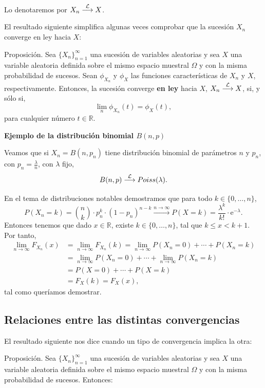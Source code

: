 \documentclass[]{book}
\begin{document}
Lo denotaremos por \(X_n\stackrel{{\cal L}}{\longrightarrow}X\).

El resultado siguiente simplifica algunas veces comprobar que la sucesión \(X_n\) converge en ley hacia \(X\):

 Proposición.
Sea \(\{X_n\}_{n=1}^\infty\) una sucesión de variables aleatorias y sea \(X\) una variable aleatoria definida sobre el mismo espacio muestral \(\Omega\) y con la misma probabilidad de sucesos. Sean \(\phi_{X_n}\) y \(\phi_X\) las funciones características de \(X_n\) y \(X\), respectivamente. Entonces, la sucesión converge \textbf{en ley} hacia \(X\), \(X_n\stackrel{{\cal L}}{\longrightarrow}X\), si, y sólo si,
\[
\lim_{n} \phi_{X_n}(t) = \phi_X(t),
\]
para cualquier número \(t\in\mathbb{R}\).

\textbf{Ejemplo de la distribución binomial \(B(n,p)\)}

Veamos que si \(X_n=B(n,p_n)\) tiene distribución binomial de parámetros \(n\) y \(p_n\), con \(p_n=\frac{\lambda}{n}\), con \(\lambda\) fijo,
\[
B(n,p)\stackrel{{\cal L}}{\longrightarrow}Poiss(\lambda).
\]

En el tema de distribuciones notables demostramos que para todo \(k\in\{0,\ldots,n\}\),
\[
P(X_n = k)=\binom{n}{k}\cdot p_n^k\cdot (1-p_n)^{n-k}\stackrel{n\to\infty}{\longrightarrow} P(X=k)=\frac{\lambda^k}{k!}\cdot\mathrm{e}^{-\lambda}.
\]
Entonces tenemos que dado \(x\in\mathbb{R}\), existe \(k\in\{0,\ldots,n\}\), tal que \(k\leq x< k+1\). Por tanto,
\[
\begin{array}{rl}
\lim\limits_{n\to\infty} F_{X_n}(x) 
& = \lim\limits_{n\to\infty} F_{X_n}(k)=\lim\limits_{n\to\infty} P(X_n=0)+\cdots + P(X_n=k) \\ 
& =\lim\limits_{n\to\infty} P(X_n=0)+\cdots + \lim\limits_{n\to\infty} P(X_n=k)\\
& = P(X=0)+\cdots + P(X=k)\\ &  =F_X(k)=F_X(x),
\end{array}
\]
tal como queríamos demostrar.

\hypertarget{relaciones-entre-las-distintas-convergencias}{%
\subsection{Relaciones entre las distintas convergencias}\label{relaciones-entre-las-distintas-convergencias}}

El resultado siguiente nos dice cuando un tipo de convergencia implica la otra:

 Proposición.
Sea \(\{X_n\}_{n=1}^\infty\) una sucesión de variables aleatorias y sea \(X\) una variable aleatoria definida sobre el mismo espacio muestral \(\Omega\) y con la misma probabilidad de sucesos. Entonces:
\end{document}
